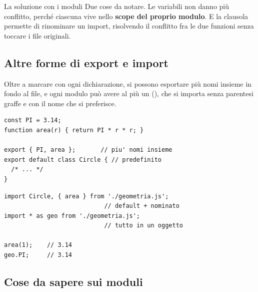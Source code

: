 \begin{esempio}{La soluzione con i moduli}
Due cose da notare. Le variabili  non danno più conflitto, perché
ciascuna vive nello \textbf{scope del proprio modulo}. E la clausola 
permette di rinominare un import, risolvendo il conflitto fra le due funzioni
 senza toccare i file originali.
\end{esempio}


\subsection{Altre forme di export e import}

Oltre a marcare con  ogni dichiarazione, si possono esportare più
nomi insieme in fondo al file, e ogni modulo può avere al più un
 (), che si importa senza
parentesi graffe e con il nome che si preferisce.

\begin{affianco}[0.45]
\begin{lstlisting}[style=js, name=geometria.js]
const PI = 3.14;
function area(r) { return PI * r * r; }

export { PI, area };       // piu' nomi insieme
export default class Circle { // predefinito
  /* ... */
}
\end{lstlisting}
\risultato
\begin{lstlisting}[style=js, name=main.js]
import Circle, { area } from './geometria.js';
                            // default + nominato
import * as geo from './geometria.js';
                            // tutto in un oggetto

area(1);    // 3.14
geo.PI;     // 3.14
\end{lstlisting}
\end{affianco}

\subsection{Cose da sapere sui moduli}

